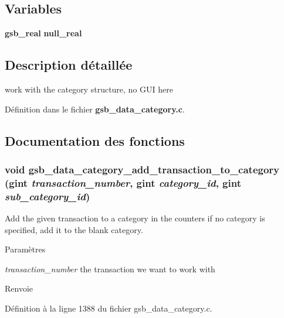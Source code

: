 \subsection*{Variables}
\begin{DoxyCompactItemize}
\item 
{\bf gsb\_\-real} {\bf null\_\-real}
\end{DoxyCompactItemize}


\subsection{Description détaillée}
work with the category structure, no GUI here 

Définition dans le fichier {\bf gsb\_\-data\_\-category.c}.



\subsection{Documentation des fonctions}
\subsubsection[{gsb\_\-data\_\-category\_\-add\_\-transaction\_\-to\_\-category}]{\setlength{\rightskip}{0pt plus 5cm}void gsb\_\-data\_\-category\_\-add\_\-transaction\_\-to\_\-category (gint {\em transaction\_\-number}, \/  gint {\em category\_\-id}, \/  gint {\em sub\_\-category\_\-id})}\label{gsb__data__category_8c_ab0125720f46b82a2e71c823b623008d7}
Add the given transaction to a category in the counters if no category is specified, add it to the blank category.


\begin{DoxyParams}{Paramètres}
\item[{\em transaction\_\-number}]the transaction we want to work with\end{DoxyParams}
\begin{DoxyReturn}{Renvoie}

\end{DoxyReturn}


Définition à la ligne 1388 du fichier gsb\_\-data\_\-category.c.

